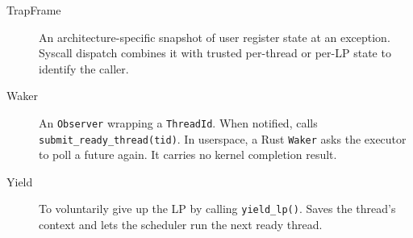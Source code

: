 \begin{description}
    \item[TrapFrame] An architecture-specific snapshot of user register state at
        an exception. Syscall dispatch combines it with trusted per-thread or
        per-LP state to identify the caller.

    \item[Waker] An \texttt{Observer} wrapping a \texttt{ThreadId}. When
        notified, calls \texttt{submit\_ready\_thread(tid)}. In userspace,
        a Rust \texttt{Waker} asks the executor to poll a future again.
        It carries no kernel completion result.

    \item[Yield] To voluntarily give up the LP by calling
        \texttt{yield\_lp()}. Saves the thread's context and lets the scheduler
        run the next ready thread.
\end{description}

\endinput
